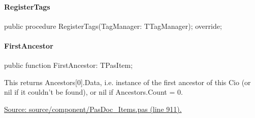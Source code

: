 \documentclass{report}
\newif\ifpdf
\begin{document}
\paragraph*{RegisterTags}\hspace*{\fill}

\label{PasDoc_Items.TPasCio-RegisterTags}
\begin{list}{}{
\setlength{\itemindent}{0cm}
\setlength{\listparindent}{0cm}
\setlength{\leftmargin}{\evensidemargin}
\addtolength{\leftmargin}{\tmplength}
\settowidth{\labelsep}{X}
\addtolength{\leftmargin}{\labelsep}
\setlength{\labelwidth}{\tmplength}
}
\item[\textbf{Declaration}\hfill]
\ifpdf
\begin{flushleft}
\fi
\begin{ttfamily}
public procedure RegisterTags(TagManager: TTagManager); override;\end{ttfamily}

\ifpdf
\end{flushleft}
\fi

\end{list}
\paragraph*{FirstAncestor}\hspace*{\fill}

\label{PasDoc_Items.TPasCio-FirstAncestor}
\begin{list}{}{
\setlength{\itemindent}{0cm}
\setlength{\listparindent}{0cm}
\setlength{\leftmargin}{\evensidemargin}
\addtolength{\leftmargin}{\tmplength}
\settowidth{\labelsep}{X}
\addtolength{\leftmargin}{\labelsep}
\setlength{\labelwidth}{\tmplength}
}
\item[\textbf{Declaration}\hfill]
\ifpdf
\begin{flushleft}
\fi
\begin{ttfamily}
public function FirstAncestor: TPasItem;\end{ttfamily}

\ifpdf
\end{flushleft}
\fi

\par
\item[\textbf{Description}]
This returns Ancestors[0].Data, i.e. instance of the first ancestor of this Cio (or nil if it couldn't be found), or nil if Ancestors.Count = 0.\par
\href{https://github.com/pasdoc/pasdoc/blob/master/source/component/PasDoc_Items.pas#L911}{Source: source/component/PasDoc{\_}Items.pas (line 911).}

\end{list}
\end{document}
